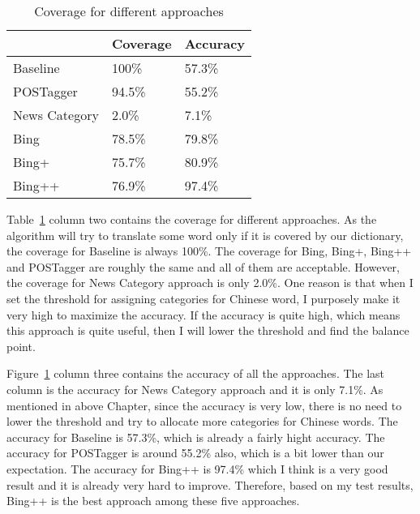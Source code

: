 \begin{CJK}{UTF8}{gbsn}
\begin{table}[ht]
  \caption{Coverage for different approaches}
  \label{table:evaluation_1}
  \begin{tabular}{| p{2cm} | p{2cm} | p{2cm} |}
    \hline
     & Coverage & Accuracy\\
    \hline
    Baseline & 100\% & 57.3\%\\
    \hline
    POSTagger & 94.5\% & 55.2\%\\
    \hline
    News Category & 2.0\% & 7.1\%\\
    \hline
    Bing & 78.5\% & 79.8\%\\
    \hline
    Bing+ & 75.7\% & 80.9\%\\
    \hline
    Bing++ & 76.9\% & 97.4\%\\
    \hline
  \end{tabular}
\end{table}

Table~\ref{table:evaluation_1} column two contains the coverage for different approaches. As the algorithm will try to translate some word only if it is covered by our dictionary, the coverage for Baseline is always 100\%. The coverage for Bing, Bing+, Bing++ and POSTagger are roughly the same and all of them are acceptable. However, the coverage for News Category approach is only 2.0\%. One reason is that when I set the threshold for assigning categories for Chinese word, I purposely make it very high to maximize the accuracy. If the accuracy is quite high, which means this approach is quite useful, then I will lower the threshold and find the balance point.

Figure~\ref{table:evaluation_1} column three contains the accuracy of all the approaches. The last column is the accuracy for News Category approach and it is only 7.1\%. As mentioned in above Chapter, since the accuracy is very low, there is no need to lower the threshold and try to allocate more categories for Chinese words. The accuracy for Baseline is 57.3\%, which is already a fairly hight accuracy. The accuracy for  POSTagger is around 55.2\% also, which is a bit lower than our expectation. The accuracy for Bing++ is 97.4\% which I think is a very good result and it is already very hard to improve. Therefore, based on my test results, Bing++ is the best approach among these five approaches.

\end{CJK}